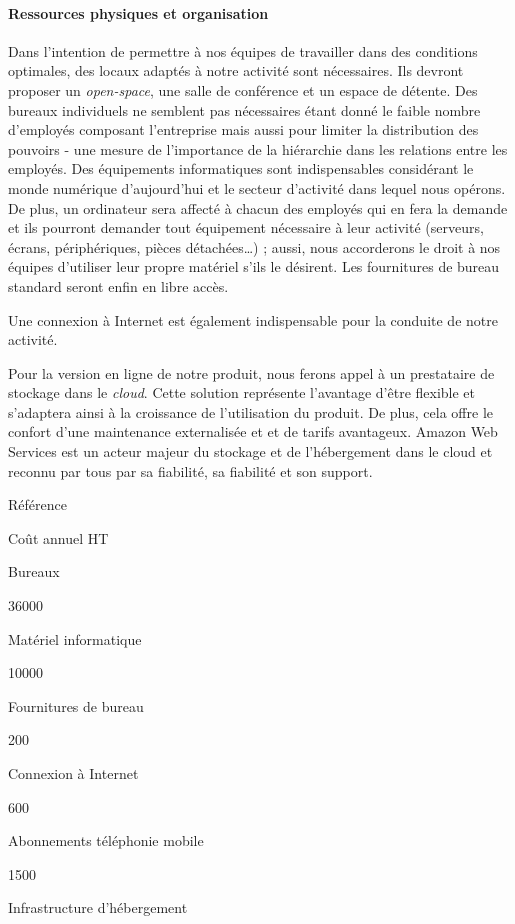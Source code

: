 \documentclass[10pt,twocolumn,a4paper,utf8x]{article}
\begin{document}
\paragraph{Ressources physiques et organisation}

Dans l'intention de permettre à nos équipes de travailler dans des
conditions optimales, des locaux adaptés à notre activité sont
nécessaires. Ils devront proposer un \emph{open-space}, une salle de
conférence et un espace de détente. Des bureaux individuels ne semblent
pas nécessaires étant donné le faible nombre d'employés composant
l'entreprise mais aussi pour limiter la distribution des pouvoirs - une
mesure de l'importance de la hiérarchie dans les relations entre les
employés. Des équipements informatiques sont indispensables considérant
le monde numérique d'aujourd'hui et le secteur d'activité dans lequel
nous opérons. De plus, un ordinateur sera affecté à chacun des employés
qui en fera la demande et ils pourront demander tout équipement
nécessaire à leur activité (serveurs, écrans, périphériques, pièces
détachées\ldots{}) ; aussi, nous accorderons le droit à nos équipes
d'utiliser leur propre matériel s'ils le désirent. Les fournitures de
bureau standard seront enfin en libre accès.

Une connexion à Internet est également indispensable pour la conduite de
notre activité.

Pour la version en ligne de notre produit, nous ferons appel à un
prestataire de stockage dans le \emph{cloud}. Cette solution représente
l'avantage d'être flexible et s'adaptera ainsi à la croissance de
l'utilisation du produit. De plus, cela offre le confort d'une
maintenance externalisée et et de tarifs avantageux. Amazon Web Services
est un acteur majeur du stockage et de l'hébergement dans le cloud et
reconnu par tous par sa fiabilité, sa fiabilité et son support.

Référence

Coût annuel HT

Bureaux

36000

Matériel informatique

10000

Fournitures de bureau

200

Connexion à Internet

600

Abonnements téléphonie mobile

1500

Infrastructure d'hébergement
\end{document}
